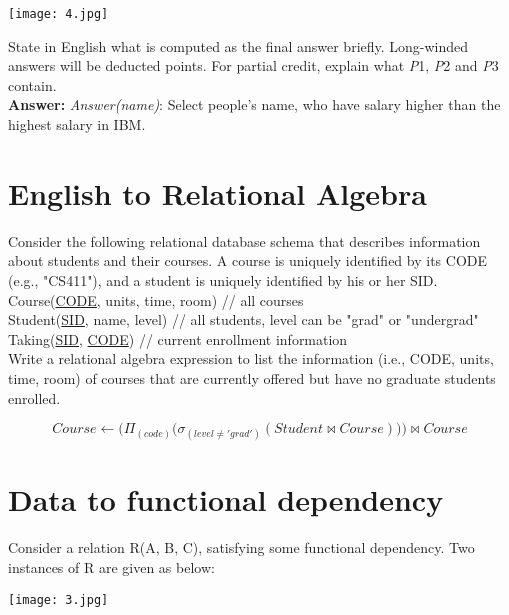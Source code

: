 \documentclass[paper=a4, fontsize=11pt]{scrartcl}
\numberwithin{equation}{section}		%
\numberwithin{figure}{section}			%
\numberwithin{table}{section}				%
\begin{document}
\texttt{[image: 4.jpg]}

State in English what is computed as the final answer briefly. Long-winded answers will
be deducted points. For partial credit, explain what \textit{P}1, \textit{P}2 and \textit{P}3 contain.\\
\textbf{Answer: }
\textit{Answer(name)}: Select people's name, who have salary higher than the highest salary in IBM.


\section{English to Relational Algebra}
Consider the following relational database schema that describes information about students
and their courses. A course is uniquely identified by its CODE (e.g., "CS411"), and a student
is uniquely identified by his or her SID.\\
Course(\underline{CODE}, units, time, room) // all courses\\
Student(\underline{SID}, name, level) // all students, level can be "grad" or "undergrad"\\
Taking(\underline{SID}, \underline{CODE}) // current enrollment information\\

Write a relational algebra expression to list the information (i.e., CODE, units, time, room) of courses that are currently offered but have no graduate students enrolled.

\begin{displaymath} 
Course \leftarrow \Big(\Pi_{(code)} \big(\sigma_{(level \neq 'grad')}(Student \bowtie Course)\big)\Big) \bowtie Course
\end{displaymath}

\section{Data to functional dependency}
Consider a relation R(A, B, C), satisfying some functional dependency. Two instances of R are given as below:

	\centerline{\texttt{[image: 3.jpg]}}
\end{document}
